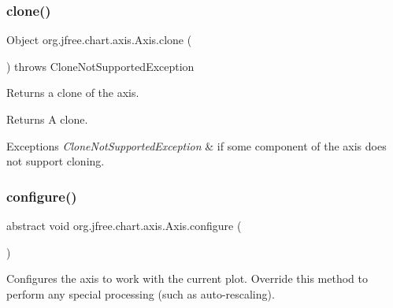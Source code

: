 \subsubsection{\texorpdfstring{clone()}{clone()}}
{\footnotesize\ttfamily Object org.\+jfree.\+chart.\+axis.\+Axis.\+clone (\begin{DoxyParamCaption}{ }\end{DoxyParamCaption}) throws Clone\+Not\+Supported\+Exception}

Returns a clone of the axis.

\begin{DoxyReturn}{Returns}
A clone.
\end{DoxyReturn}

\begin{DoxyExceptions}{Exceptions}
{\em Clone\+Not\+Supported\+Exception} & if some component of the axis does not support cloning. \\
\hline
\end{DoxyExceptions}
\mbox{\label{classorg_1_1jfree_1_1chart_1_1axis_1_1_axis_a02e97b6175f02020bcc15127b5882e63}} 
\subsubsection{\texorpdfstring{configure()}{configure()}}
{\footnotesize\ttfamily abstract void org.\+jfree.\+chart.\+axis.\+Axis.\+configure (\begin{DoxyParamCaption}{ }\end{DoxyParamCaption})\hspace{0.3cm}{\ttfamily [abstract]}}

Configures the axis to work with the current plot. Override this method to perform any special processing (such as auto-\/rescaling). \mbox{\label{classorg_1_1jfree_1_1chart_1_1axis_1_1_axis_a6c61fba1bc787b780a44bc2bdd90a7f9}} 

